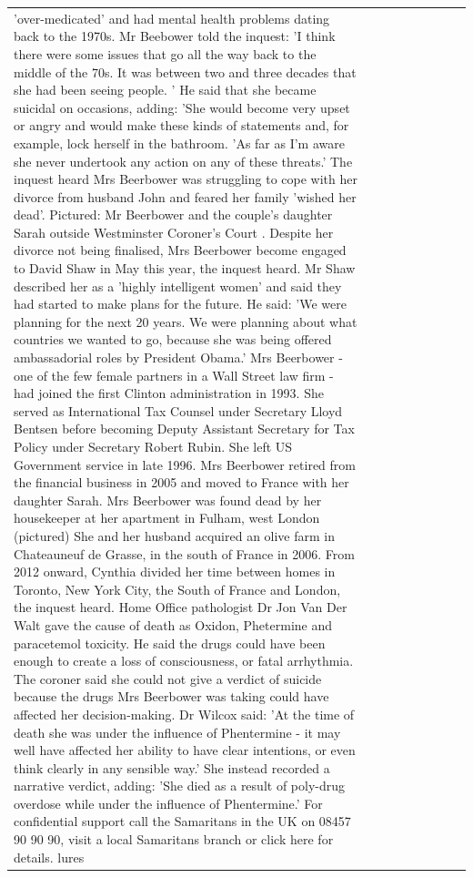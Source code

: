 \begin{table}[H]
\begin{tabular}{lllrlllll}
'over-medicated' and had mental health problems dating back to the 1970s. Mr Beebower told the inquest: 'I think there were some issues that go all the way back to the middle of the 70s. It was between two and three decades that she had been seeing people. ' He said that she became suicidal on occasions, adding: 'She would become very upset or angry and would make these kinds of statements and, for example, lock herself in the bathroom. 'As far as I'm aware she never undertook any action on any of these threats.' The inquest heard Mrs Beerbower was struggling to cope with her divorce from husband John and feared her family 'wished her dead'. Pictured: Mr Beerbower and the couple's daughter Sarah outside Westminster Coroner's Court . Despite her divorce not being finalised, Mrs Beerbower become engaged to David Shaw in May this year, the inquest heard. Mr Shaw described her as a 'highly intelligent women' and said they had started to make plans for the future. He said: 'We were planning for the next 20 years. We were planning about what countries we wanted to go, because she was being offered ambassadorial roles by President Obama.' Mrs Beerbower - one of the few female partners in a Wall Street law firm - had joined the first Clinton administration in 1993. She served as International Tax Counsel under Secretary Lloyd Bentsen before becoming Deputy Assistant Secretary for Tax Policy under Secretary Robert Rubin. She left US Government service in late 1996. Mrs Beerbower retired from the financial business in 2005 and moved to France with her daughter Sarah. Mrs Beerbower was found dead by her housekeeper at her apartment in Fulham, west London (pictured) She and her husband acquired an olive farm in Chateauneuf de Grasse, in the south of France in 2006. From 2012 onward, Cynthia divided her time between homes in Toronto, New York City, the South of France and London, the inquest heard. Home Office pathologist Dr Jon Van Der Walt gave the cause of death as Oxidon, Phetermine and paracetemol toxicity. He said the drugs could have been enough to create a loss of consciousness, or fatal arrhythmia. The coroner said she could not give a verdict of suicide because the drugs Mrs Beerbower was taking could have affected her decision-making. Dr Wilcox said: 'At the time of death she was under the influence of Phentermine - it may well have affected her ability to have clear intentions, or even think clearly in any sensible way.' She instead recorded a narrative verdict, adding: 'She died as a result of poly-drug overdose while under the influence of Phentermine.' For confidential support call the Samaritans in the UK on 08457 90 90 90, visit a local Samaritans branch or click here for details. lures \\

\end{tabular}
\end{table}
